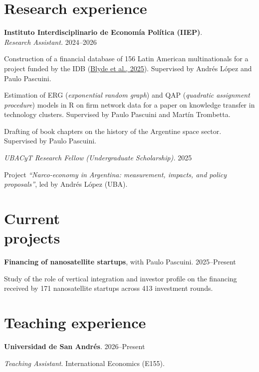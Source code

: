 \documentclass[11pt]{article}
\newcommand{\entrydate}[1]{\hfill{\small{#1}}}
\begin{document}
\section{Research experience}
\textbf{Instituto Interdisciplinario de Economía Política (IIEP)}.
\\
\textit{Research Assistant.} \entrydate{2024--2026}
\begin{cvitems}
    \item Construction of a financial database of 156 Latin American multinationals for a project funded by the IDB (\href{https://publications.iadb.org/es/multilatinas-en-movimiento-caracteristicas-motivaciones-y-lineamientos-de-politica}{Blyde et al., 2025}). Supervised by Andrés López and Paulo Pascuini.
    \item Estimation of ERG (\textit{exponential random graph}) and QAP (\textit{quadratic assignment procedure}) models in R on firm network data for a paper on knowledge transfer in technology clusters. Supervised by Paulo Pascuini and Martín Trombetta.
    \item Drafting of book chapters on the history of the Argentine space sector. Supervised by Paulo Pascuini.
\end{cvitems}
\vspace{5pt}
\textit{UBACyT Research Fellow (Undergraduate Scholarship).} \entrydate{2025}
\begin{cvitems}
    \item Project \emph{``Narco-economy in Argentina: measurement, impacts, and policy proposals''}, led by Andrés López (UBA).
\end{cvitems}

\section{Current\\projects}
\textbf{Financing of nanosatellite startups}, with Paulo Pascuini. \entrydate{2025--Present}
\begin{cvitems}
  \item Study of the role of vertical integration and investor profile on the financing received by 171 nanosatellite startups across 413 investment rounds. 
\end{cvitems}

\section{Teaching experience}
\textbf{Universidad de San Andrés}. \entrydate{2026--Present}
\begin{cvitems}
  \item \textit{Teaching Assistant}. International Economics (E155).
\end{cvitems}
\end{document}
